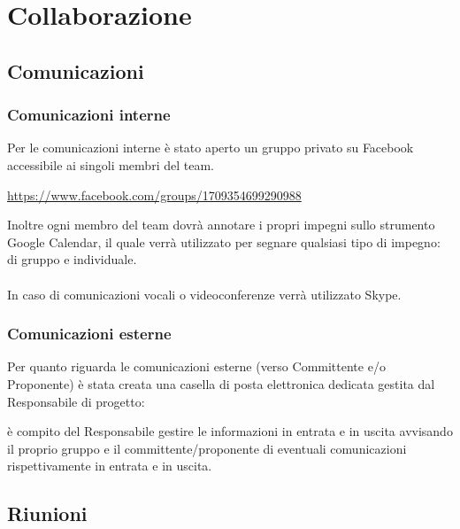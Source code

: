 \section{Collaborazione}{
\subsection{Comunicazioni}
	\subsubsection{Comunicazioni interne}{
		Per le comunicazioni interne \`{e} stato aperto un gruppo privato su Facebook accessibile ai singoli membri del team. \begin{center}
			\url{https://www.facebook.com/groups/1709354699290988}
		\end{center} 
		Inoltre ogni membro del team dovr\`{a} annotare i propri impegni sullo strumento Google Calendar, il quale verr\`{a} utilizzato per segnare qualsiasi tipo di impegno: di gruppo e individuale.\\\\
		In caso di comunicazioni vocali o videoconferenze verrà utilizzato Skype.
		
	 }
	\subsubsection{Comunicazioni esterne}{
	Per quanto riguarda le comunicazioni esterne (verso Committente e/o Proponente) \`{e} stata creata una casella di posta elettronica dedicata gestita dal Responsabile di progetto: \begin{center}
		\href{mailto:\mail}{\mail} \end{center} \`{e} compito del Responsabile gestire le informazioni in entrata e in uscita avvisando il proprio gruppo e il committente/proponente di eventuali comunicazioni rispettivamente in entrata e in uscita.
		}
}

\subsection{Riunioni}
